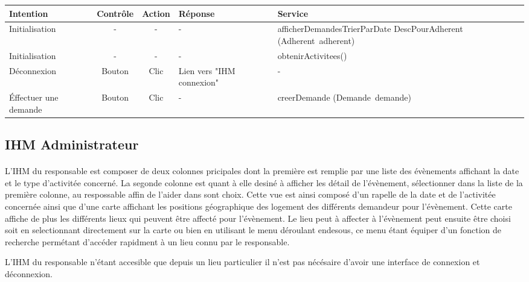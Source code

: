 \documentclass[a4paper,11pt]{article}
\begin{document}
\begin{table}[H]
  \begin{center}
    \begin{tabular}{|M{2.5cm}|c|c|M{3cm}|m{5cm}|}
       \hline
       \textbf{Intention} & \textbf{Contrôle} & \textbf{Action} & \textbf{Réponse} & \textbf{Service} \\ 
       \hline
       Initialisation & - & - & - & afficherDemandesTrierParDate DescPourAdherent (Adherent~adherent) \\ 
       \hline
       Initialisation & - & - & - & obtenirActivitees() \\ 
       \hline
       Déconnexion & Bouton & Clic & Lien vers "IHM connexion" & - \\ 
       \hline
       Éffectuer une demande & Bouton & Clic & - & creerDemande (Demande~demande) \\ 
       \hline
    \end{tabular}
  \end{center}
\end{table}

\pagebreak
\subsection{IHM Administrateur}

\paragraph{}
L'IHM du responsable est composer de deux colonnes pricipales dont la première est remplie par une liste des évènements affichant la date et le type d'activitée concerné. La segonde colonne est quant à elle desiné à afficher les détail de l'évènement, sélectionner dans la liste de la première colonne, au respossable affin de l'aider dans sont choix. Cette vue est ainsi composé d'un rapelle de la date et de l'activitée concernée ainsi que d'une carte affichant les positions géographique des logement des différents demandeur pour l'évènement. Cette carte affiche de plus les différents lieux qui peuvent être affecté pour l'évènement. Le lieu peut à affecter à l'évènement peut ensuite être choisi soit en selectionnant directement sur la carte ou bien en utilisant le menu déroulant endesous, ce menu étant équiper d'un fonction de recherche permétant d'accéder rapidment à un lieu connu par le responsable.

L'IHM du responsable n'étant accesible que depuis un lieu particulier il n'est pas nécésaire d'avoir une interface de connexion et déconnexion.
\end{document}
